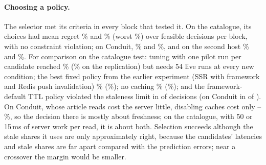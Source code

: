 \documentclass[acmsmall,review,nonacm]{acmart}
\begin{document}
\paragraph{Choosing a policy.}
The selector met its criteria in every block that tested it. On the catalogue, its choices had mean regret \revTRegret\% and \revRRegret\% (worst \revTRegretWorst\%) over \revTDecisions{} feasible decisions per block, with no constraint violation; on Conduit, \cdTRegret\% and \cdRRegret\%, and on the second host \cdHTRegret\% and \cdHRRegret\%. For comparison on the catalogue test: tuning with one pilot run per candidate reached \revTTuningRegret\% (\revRTuningRegret\% on the replication) but needs 54 live runs at every new condition; the best fixed policy from the earlier experiment (SSR with framework and Redis push invalidation) \revTFixedRegret\% (\revRFixedRegret\%); no caching \revTNocacheRegret\% (\revRNocacheRegret\%); and the framework-default TTL policy violated the staleness limit in \revTDefaultViol{} of \revTDecisions{} decisions (on Conduit in \cdTDefaultViol{} of \cdTDecisions). On Conduit, whose article reads cost the server little, disabling caches cost only \cdTNocacheRegret--\cdHRNocacheRegret\%, so the decision there is mostly about freshness; on the catalogue, with 50 or 15\,ms of server work per read, it is about both. Selection succeeds although the stale shares it uses are only approximately right, because the candidates' latencies and stale shares are far apart compared with the prediction errors; near a crossover the margin would be smaller.
\end{document}

